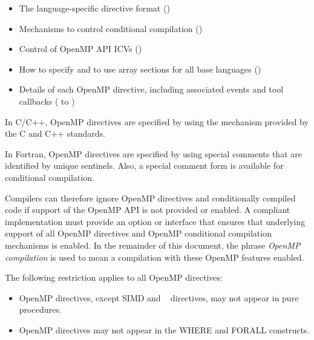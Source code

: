 \begin{itemize}
\item The language-specific directive format
()

\item Mechanisms to control conditional compilation
()

\item Control of OpenMP API ICVs
()

\item How to specify and to use array sections for all base languages
()

\item Details of each OpenMP directive, including associated events and tool callbacks
( to
)
\end{itemize}

\begin{ccppspecific}
In C/C++, OpenMP directives are specified by using the  mechanism provided
by the C and C++ standards.
\end{ccppspecific}

\begin{fortranspecific}
In Fortran, OpenMP directives are specified by using special comments that are
identified by unique sentinels. Also, a special comment form is available for conditional
compilation.
\end{fortranspecific}

Compilers can therefore ignore OpenMP directives and conditionally compiled code if
support of the OpenMP API is not provided or enabled. A compliant implementation
must provide an option or interface that ensures that underlying support of all OpenMP
directives and OpenMP conditional compilation mechanisms is enabled. In the
remainder of this document, the phrase \emph{OpenMP compilation} is used to mean a
compilation with these OpenMP features enabled.

\begin{samepage}
\begin{fortranspecific}
\restrictions
The following restriction applies to all OpenMP directives:
\begin{itemize}
\item OpenMP directives, except SIMD and ~ directives,
 may not appear in pure procedures.
\item OpenMP directives may not appear in the WHERE and FORALL constructs.
\end{itemize}
\end{fortranspecific}
\end{samepage}


